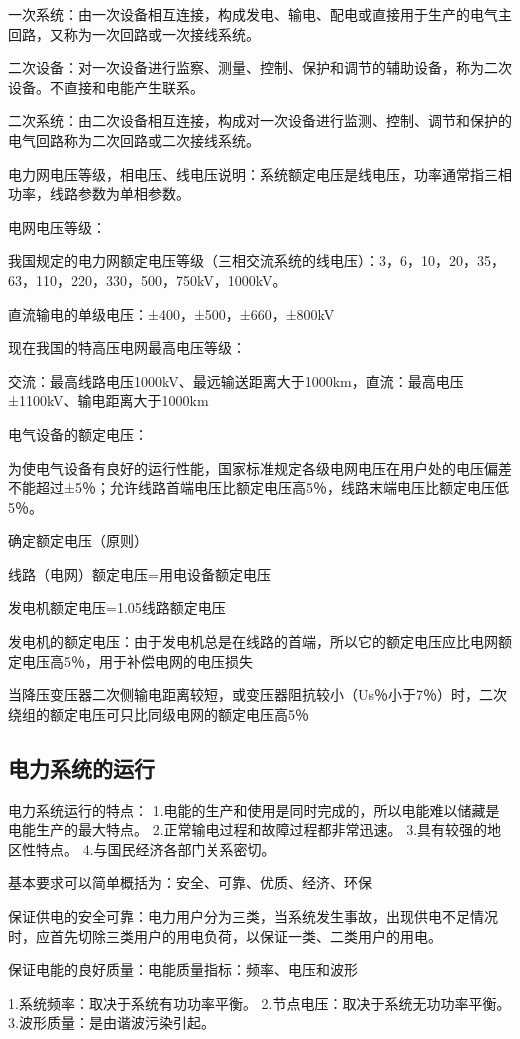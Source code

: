 \documentclass[UTF8, 12pt, a4paper]{ctexart}
\begin{document}
一次系统：由一次设备相互连接，构成发电、输电、配电或直接用于生产的电气主回路，又称为一次回路或一次接线系统。

二次设备：对一次设备进行监察、测量、控制、保护和调节的辅助设备，称为二次设备。不直接和电能产生联系。

二次系统：由二次设备相互连接，构成对一次设备进行监测、控制、调节和保护的电气回路称为二次回路或二次接线系统。

电力网电压等级，相电压、线电压说明：系统额定电压是线电压，功率通常指三相功率，线路参数为单相参数。

电网电压等级：

我国规定的电力网额定电压等级（三相交流系统的线电压）：3，6，10，20，35，63，110，220，330，500，750kV，1000kV。

直流输电的单级电压：±400，±500，±660，±800kV

现在我国的特高压电网最高电压等级：

交流：最高线路电压1000kV、最远输送距离大于1000km，直流：最高电压±1100kV、输电距离大于1000km

电气设备的额定电压：

为使电气设备有良好的运行性能，国家标准规定各级电网电压在用户处的电压偏差不能超过±5％；允许线路首端电压比额定电压高5％，线路末端电压比额定电压低5％。

确定额定电压（原则）

线路（电网）额定电压=用电设备额定电压

发电机额定电压=1.05线路额定电压

发电机的额定电压：由于发电机总是在线路的首端，所以它的额定电压应比电网额定电压高5％，用于补偿电网的电压损失

当降压变压器二次侧输电距离较短，或变压器阻抗较小（Us％小于7％）时，二次绕组的额定电压可只比同级电网的额定电压高5％
\subsection{电力系统的运行}
电力系统运行的特点：
1.电能的生产和使用是同时完成的，所以电能难以储藏是电能生产的最大特点。
2.正常输电过程和故障过程都非常迅速。
3.具有较强的地区性特点。
4.与国民经济各部门关系密切。

基本要求可以简单概括为：安全、可靠、优质、经济、环保

保证供电的安全可靠：电力用户分为三类，当系统发生事故，出现供电不足情况时，应首先切除三类用户的用电负荷，以保证一类、二类用户的用电。

保证电能的良好质量：电能质量指标：频率、电压和波形

1.系统频率：取决于系统有功功率平衡。
2.节点电压：取决于系统无功功率平衡。
3.波形质量：是由谐波污染引起。
\end{document}
